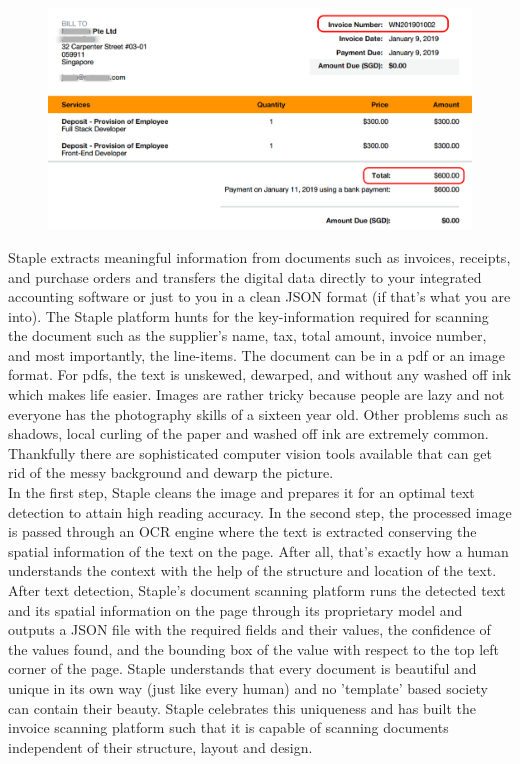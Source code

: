 \documentclass[11pt]{article}
\begin{document}
\begin{figure}
\centering
\includegraphics[scale= 0.4]{formatting}
\end{figure}


\noindent Staple extracts meaningful information from documents such as invoices, receipts, and purchase orders and transfers the digital data directly to your integrated accounting software or just to you in a clean JSON format (if that's what you are into). The Staple platform hunts for the key-information required for scanning the document such as the supplier's name, tax, total amount, invoice number, and most importantly, the line-items. The document can be in a pdf or an image format. For pdfs, the text is unskewed, dewarped, and without any washed off ink which makes life easier. Images are rather tricky because people are lazy and not everyone has the photography skills of a sixteen year old. Other problems such as shadows, local curling of the paper and washed off ink are extremely common. Thankfully there are sophisticated computer vision tools available that can get rid of the messy background and dewarp the picture. \\

\noindent In the first step, Staple cleans the image and prepares it for an optimal text detection to attain high reading accuracy. In the second step, the processed image is passed through an OCR engine where the text is extracted conserving the spatial information of the text on the page. After all, that's exactly how a human understands the context with the help of the structure and location of the text. After text detection, Staple's document scanning platform runs the detected text and its spatial information on the page through its proprietary model and outputs  a JSON file with the required fields and their values, the confidence of the values found, and the bounding box of the value with respect to the top left corner of the page. Staple understands that every document is beautiful and unique in its own way (just like every human) and no 'template' based society can contain their beauty. Staple celebrates this uniqueness and has built the invoice scanning platform such that it is capable of scanning documents independent of their structure, layout and design. \\
\end{document}
